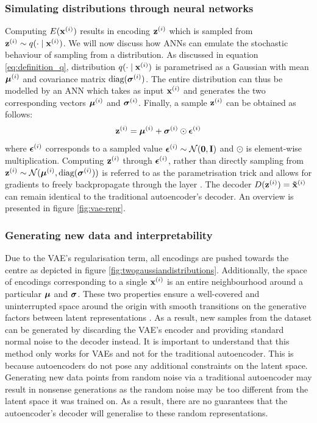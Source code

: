 \subsubsection{Simulating distributions through neural networks}
	Computing $E(\mathbf{x}^{(i)})$ results in encoding $\mathbf{z}^{(i)}$ which is sampled from $\mathbf{z}^{(i)} \sim q ( \cdot \mid \mathbf{x}^{(i)})$. We will now discuss how ANNs can emulate the stochastic behaviour of sampling from a distribution. As discussed in equation \ref{eq:definition_q}, distribution $q ( \cdot \mid \mathbf{x}^{(i)})$ is parametrised as a Gaussian with mean $\bm{\mu}^{(i)}$ and covariance matrix $\text{diag}(\bm{\sigma}^{(i)})$. The entire distribution can thus be modelled by an ANN which takes as input $\mathbf{x}^{(i)}$ and generates the two corresponding vectors $\bm{\mu}^{(i)}$ and $\bm{\sigma}^{(i)}$. Finally, a sample $\mathbf{z}^{(i)}$ can be obtained as follows:
	\begin{equation}
		\mathbf{z}^{(i)} = \bm{\mu}^{(i)} + \bm{\sigma}^{(i)} \odot \bm{\epsilon}^{(i)}
	\end{equation}
	where $\bm{\epsilon}^{(i)}$ corresponds to a sampled value $\bm{\epsilon}^{(i)} \sim \mathcal{N}(\bm{\mathbf{0}}, \mathbf{I})$ and $\odot$ is element-wise multiplication. Computing $\mathbf{z}^{(i)}$ through $\bm{\epsilon}^{(i)}$, rather than directly sampling from $\mathbf{z}^{(i)} \sim \mathcal{N}(\bm{\mu}^{(i)}, \text{diag}(\bm{\sigma}^{(i)}))$ is referred to as the parametrisation trick and allows for gradients to freely backpropagate through the layer \citep{davidfosterVariationalAutoencoders2023}. The decoder $D(\mathbf{z}^{(i)}) = \mathbf{\tilde{x}}^{(i)}$ can remain identical to the traditional autoencoder's decoder. An overview is presented in figure \ref{fig:vae-repr}.
	
	
	
	
	
	




	
	


\subsubsection{Generating new data and interpretability}	
	Due to the VAE's regularisation term, all encodings are pushed towards the centre as depicted in figure \ref{fig:twogaussiandistributions}. Additionally, the space of encodings corresponding to a single $\mathbf{x}^{(i)}$ is an entire neighbourhood around a particular $\bm{\mu}$ and $\bm{\sigma}$. These two properties ensure a well-covered and uninterrupted space around the origin with smooth transitions on the generative factors between latent representations \citep{davidfosterVariationalAutoencoders2023}. As a result, new samples from the dataset can be generated by discarding the VAE's encoder and providing standard normal noise to the decoder instead. It is important to understand that this method only works for VAEs and not for the traditional autoencoder. This is because autoencoders do not pose any additional constraints on the latent space. Generating new data points from random noise via a traditional autoencoder may result in nonsense generations as the random noise may be too different from the latent space it was trained on. As a result, there are no guarantees that the autoencoder's decoder will generalise to these random representations.
	
